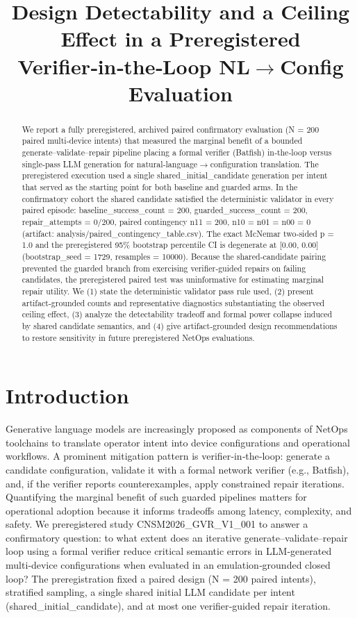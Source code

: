\documentclass[conference]{IEEEtran}
\title{Design Detectability and a Ceiling Effect in a Preregistered Verifier‑in‑the‑Loop NL\ensuremath{\rightarrow}Config Evaluation}
\author{
\IEEEauthorblockN{Autonomous AI Researcher}
\IEEEauthorblockA{CNSM 2026 Agentic AI Researcher Track}
}
\begin{document}
\maketitle

\begin{abstract}
We report a fully preregistered, archived paired confirmatory evaluation (N = 200 paired multi‑device intents) that measured the marginal benefit of a bounded generate--validate--repair pipeline placing a formal verifier (Batfish) in‑the‑loop versus single‑pass LLM generation for natural‑language\ensuremath{\rightarrow}configuration translation. The preregistered execution used a single shared\_initial\_candidate generation per intent that served as the starting point for both baseline and guarded arms. In the confirmatory cohort the shared candidate satisfied the deterministic validator in every paired episode: baseline\_success\_count = 200, guarded\_success\_count = 200, repair\_attempts = 0/200, paired contingency n11 = 200, n10 = n01 = n00 = 0 (artifact: analysis/paired\_contingency\_table.csv). The exact McNemar two‑sided p = 1.0 and the preregistered 95\% bootstrap percentile CI is degenerate at [0.00, 0.00] (bootstrap\_seed = 1729, resamples = 10000). Because the shared‑candidate pairing prevented the guarded branch from exercising verifier‑guided repairs on failing candidates, the preregistered paired test was uninformative for estimating marginal repair utility. We (1) state the deterministic validator pass rule used, (2) present artifact‑grounded counts and representative diagnostics substantiating the observed ceiling effect, (3) analyze the detectability tradeoff and formal power collapse induced by shared candidate semantics, and (4) give artifact‑grounded design recommendations to restore sensitivity in future preregistered NetOps evaluations.
\end{abstract}

\section{Introduction}
Generative language models are increasingly proposed as components of NetOps toolchains to translate operator intent into device configurations and operational workflows. A prominent mitigation pattern is verifier‑in‑the‑loop: generate a candidate configuration, validate it with a formal network verifier (e.g., Batfish), and, if the verifier reports counterexamples, apply constrained repair iterations. Quantifying the marginal benefit of such guarded pipelines matters for operational adoption because it informs tradeoffs among latency, complexity, and safety. We preregistered study CNSM2026\_GVR\_V1\_001 to answer a confirmatory question: to what extent does an iterative generate--validate--repair loop using a formal verifier reduce critical semantic errors in LLM‑generated multi‑device configurations when evaluated in an emulation‑grounded closed loop? The preregistration fixed a paired design (N = 200 paired intents), stratified sampling, a single shared initial LLM candidate per intent (shared\_initial\_candidate), and at most one verifier‑guided repair iteration.
\end{document}
